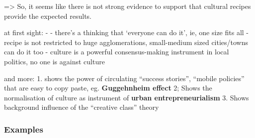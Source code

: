\documentclass{article}
\begin{document}
=> So, it seems like there is not strong evidence to support that cultural recipes provide the expected results. 

at first sight:
- 
- there's a thinking that `everyone can do it', ie, one size fits all
- recipe is not restricted to huge agglomerations, small-medium sized cities/towns can do it too
- culture is a powerful consensus-making instrument in local politics, no one is against culture

and more:
1. shows the power of circulating ``success stories'', ``mobile policies'' that are easy to copy paste, eg. \textbf{Guggehnheim effect}
2; Shows the normalisation of culture as instrument of \textbf{urban entrepreneurialism}
3. Shows background influence of the ``creative class'' theory

\subsubsection{Examples}
\end{document}
